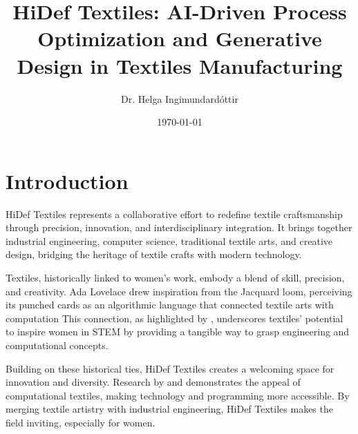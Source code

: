 \documentclass{article}
\title{HiDef Textiles: AI-Driven Process Optimization and Generative Design in Textiles Manufacturing}
\author{Dr. Helga Ingimundardóttir}
\date{\today}
\begin{document}
    \maketitle



    \section{Introduction}

    HiDef Textiles represents a collaborative effort to redefine textile craftsmanship through precision, innovation,
    and interdisciplinary integration. It brings together industrial engineering, computer science, traditional
    textile arts, and creative design, bridging the heritage of textile crafts with modern technology.

    Textiles, historically linked to women's work, embody a blend of skill, precision, and creativity. Ada Lovelace
    drew inspiration from the Jacquard loom, perceiving its punched cards as an algorithmic language that connected
    textile arts with computation
    This connection, as highlighted by \cite{sadieplant}, underscores textiles' potential to inspire women in STEM by
    providing a tangible way to grasp engineering and computational concepts.

    Building on these historical ties, HiDef Textiles creates a welcoming space for innovation and diversity.
    Research by \cite{qiu2013} and \cite{keune2022} demonstrates the appeal of computational
    textiles, making technology and programming more accessible. By merging textile artistry with industrial
    engineering, HiDef Textiles makes the field inviting, especially for women.
\end{document}
